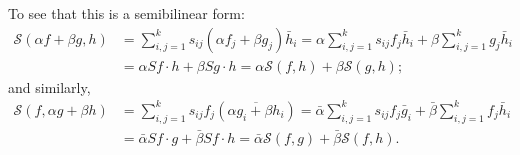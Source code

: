 \documentclass[12pt, oneside, a4paper]{article}
\begin{document}
To see that this is a semibilinear form:
\begin{align*}
    \mathcal{S}(\alpha f+\beta g, h)
    &= \sum_{i,j=1}^k s_{ij}(\alpha f_j + \beta g_j)\bar{h}_i
    = \alpha \sum_{i,j=1}^k s_{ij}f_j\bar{h}_i + \beta \sum_{i,j=1}^k g_j\bar{h}_i\\
    &= \alpha Sf\cdot h + \beta Sg\cdot h
    = \alpha\mathcal{S}(f,h) + \beta\mathcal{S}(g,h);
\end{align*}
and similarly,
\begin{align*}
    \mathcal{S}(f, \alpha g + \beta h)
    &= \sum_{i,j=1}^k s_{ij}f_j(\overline{\alpha g_i + \beta h_i})
    = \bar{\alpha}\sum_{i,j=1}^k s_{ij}f_j\bar{g}_i + \bar{\beta}\sum_{i,j=1}^k f_j \bar{h}_i\\
    &= \bar{\alpha}Sf\cdot g + \bar{\beta}Sf\cdot h
    = \bar{\alpha}\mathcal{S}(f,g) + \bar{\beta}\mathcal{S}(f,h).
\end{align*}
\end{document}
